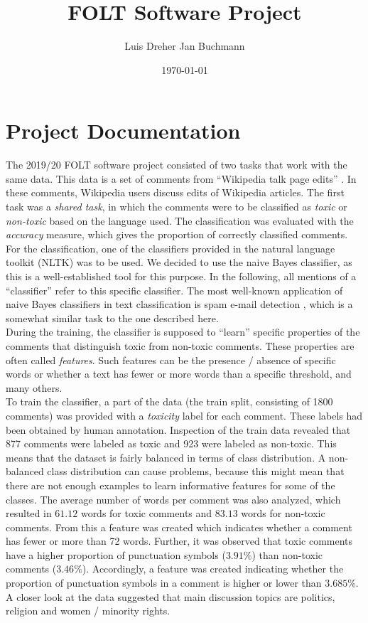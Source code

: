 \documentclass[11pt,a4paper]{article}
\title{FOLT Software Project}
\author{Luis Dreher \And Jan Buchmann}
\date{\today}
\begin{document}
\maketitle


\section{Project Documentation}
The 2019/20 FOLT software project consisted of two tasks that work with the same data. This data is a set of comments from ``Wikipedia talk page edits'' \cite{taskdescription}. In these comments, Wikipedia users discuss edits of Wikipedia articles. The first task was a \textit{shared task}, in which the comments were to be classified as \textit{toxic} or \textit{non-toxic} based on the language used. The classification was evaluated with the \textit{accuracy} measure, which gives the proportion of correctly classified comments. \\
For the classification, one of the classifiers provided in the natural language toolkit (NLTK) \citep{nltkbook} was to be used. We decided to use the naive Bayes classifier, as this is a well-established tool for this purpose. In the following, all mentions of a ``classifier'' refer to this specific classifier. The most well-known application of naive Bayes classifiers in text classification is spam e-mail detection \cite{naivebayesspam}, which is a somewhat similar task to the one described here. \\
During the training, the classifier is supposed to ``learn'' specific properties of the comments that distinguish toxic from non-toxic comments. These properties are often called \textit{features}. Such features can be the presence / absence of specific words or whether a text has fewer or more words than a specific threshold, and many others. \\
To train the classifier, a part of the data (the train split, consisting of 1800 comments) was provided with a \textit{toxicity} label for each comment. These labels had been obtained by human annotation. Inspection of the train data revealed that 877 comments were labeled as toxic and 923 were labeled as non-toxic. This means that the dataset is fairly balanced in terms of class distribution. A non-balanced class distribution can cause problems, because this might mean that there are not enough examples to learn informative features for some of the classes. The average number of words per comment was also analyzed, which resulted in $61.12$ words for toxic comments and $83.13$ words for non-toxic comments. From this a feature was created which indicates whether a comment has fewer or more than 72 words. Further, it was observed that toxic comments have a higher proportion of punctuation symbols ($3.91\%$) than non-toxic comments ($3.46\%$). Accordingly, a feature was created indicating whether the proportion of punctuation symbols in a comment is higher or lower than $3.685\%$. A closer look at the data suggested that main discussion topics are politics, religion and women / minority rights. \\
\end{document}
